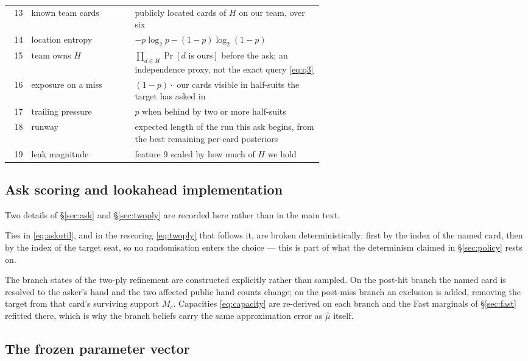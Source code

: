 \begin{table}[ht]
\begin{tabular}{rlp{0.60\linewidth}}
13 & known team cards    & publicly located cards of $H$ on our team, over six \\
14 & location entropy    & $-p\log_2 p - (1-p)\log_2(1-p)$ \\
15 & team owns $H$       & $\prod_{d \in H}\Pr[d \text{ is ours}]$ before the ask; an independence proxy, not the exact query \eqref{eq:q3} \\
16 & exposure on a miss  & $(1-p)\cdot$ our cards visible in half-suits the target has asked in \\
17 & trailing pressure   & $p$ when behind by two or more half-suits \\
18 & runway              & expected length of the run this ask begins, from the best remaining per-card posteriors \\
19 & leak magnitude      & feature 9 scaled by how much of $H$ we hold \\
\bottomrule
\end{tabular}
\end{table}

\subsection{Ask scoring and lookahead implementation}
\label{app:params-ask}

Two details of \S\ref{sec:ask} and \S\ref{sec:twoply} are recorded here rather
than in the main text.

Ties in \eqref{eq:askutil}, and in the rescoring \eqref{eq:twoply} that follows
it, are broken deterministically: first by the index of the named card, then by
the index of the target seat, so no randomisation enters the choice --- this is
part of what the determinism claimed in \S\ref{sec:policy} rests on.

The branch states of the two-ply refinement are constructed explicitly rather
than sampled. On the post-hit branch the named card is resolved to the asker's
hand and the two affected public hand counts change; on the post-miss branch an
exclusion is added, removing the target from that card's surviving support $M_c$.
Capacities \eqref{eq:capacity} are re-derived on each branch and the Fast
marginals of \S\ref{sec:fast} refitted there, which is why the branch beliefs
carry the same approximation error as $\hat\mu$ itself.

\subsection{The frozen parameter vector}

